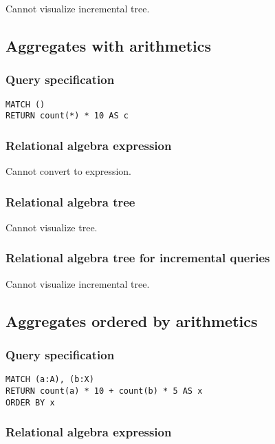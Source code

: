Cannot visualize incremental tree.

\subsection{Aggregates with arithmetics}

\subsubsection*{Query specification}

\begin{lstlisting}
MATCH ()
RETURN count(*) * 10 AS c
\end{lstlisting}

\subsubsection*{Relational algebra expression}

Cannot convert to expression.

\subsubsection*{Relational algebra tree}

Cannot visualize tree.

\subsubsection*{Relational algebra tree for incremental queries}

Cannot visualize incremental tree.

\subsection{Aggregates ordered by arithmetics}

\subsubsection*{Query specification}

\begin{lstlisting}
MATCH (a:A), (b:X)
RETURN count(a) * 10 + count(b) * 5 AS x
ORDER BY x
\end{lstlisting}

\subsubsection*{Relational algebra expression}

